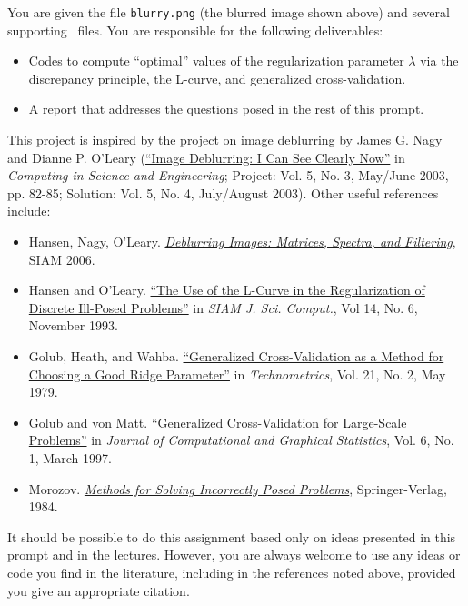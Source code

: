 \documentclass[12pt, leqno]{article} %
\begin{document}
You are given the file {\tt blurry.png} (the blurred image shown above)
and several supporting \matlab\ files.
You are responsible for the following deliverables:
\begin{itemize}
\item Codes to compute ``optimal'' values of the regularization
  parameter $\lambda$ via the discrepancy principle, the L-curve,
  and generalized cross-validation.
\item A report that addresses the questions posed in the rest of this
  prompt.
\end{itemize}
This project is inspired by the project on image deblurring by James
G. Nagy and Dianne P. O'Leary (\href{http://ieeexplore.ieee.org/document/1196312/}{``Image Deblurring: I Can See Clearly
Now''} in {\em Computing in Science and Engineering}; Project: Vol. 5,
No. 3, May/June 2003, pp. 82-85; Solution: Vol. 5, No. 4, July/August
2003).  Other useful references include:
\begin{itemize}
  \item Hansen, Nagy, O'Leary.  \href{http://epubs.siam.org/doi/book/10.1137/1.9780898718874}{\em Deblurring Images: Matrices, Spectra, and Filtering}, SIAM 2006.
  \item Hansen and O'Leary.  \href{http://epubs.siam.org/doi/abs/10.1137/0914086}{``The Use of the L-Curve in the Regularization of Discrete Ill-Posed Problems''} in {\em SIAM J. Sci. Comput.}, Vol 14, No. 6, November 1993.
  \item Golub, Heath, and Wahba.  \href{http://www.stat.wisc.edu/~wahba/ftp1/oldie/golub.heath.wahba.pdf}{``Generalized Cross-Validation as a Method for Choosing a Good Ridge Parameter''} in {\em Technometrics}, Vol. 21, No. 2, May 1979.
  \item Golub and von Matt. \href{https://www.jstor.org/stable/pdf/1390722.pdf}{``Generalized Cross-Validation for Large-Scale Problems''} in {\em Journal of Computational and Graphical Statistics}, Vol. 6, No. 1, March 1997.
  \item Morozov.  \href{https://link.springer.com/book/10.1007%2F978-1-4612-5280-1}{\em Methods for Solving Incorrectly Posed Problems},
  Springer-Verlag, 1984.
\end{itemize}
It should be possible to do this assignment based only on ideas
presented in this prompt and in the lectures.  However,
you are always welcome to use any ideas or code you find in the
literature, including in the references noted above, provided you
give an appropriate citation.
\end{document}

